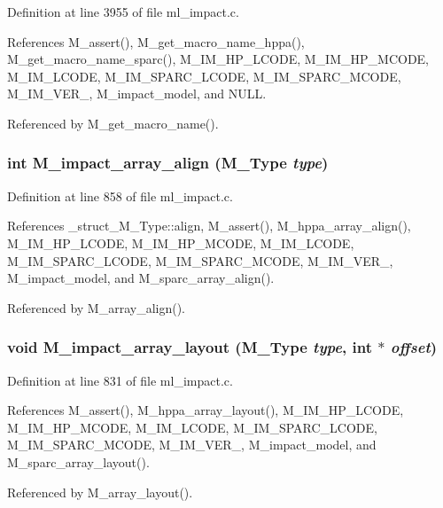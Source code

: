 Definition at line 3955 of file ml\_\-impact.c.

References M\_\-assert(), M\_\-get\_\-macro\_\-name\_\-hppa(), M\_\-get\_\-macro\_\-name\_\-sparc(), M\_\-IM\_\-HP\_\-LCODE, M\_\-IM\_\-HP\_\-MCODE, M\_\-IM\_\-LCODE, M\_\-IM\_\-SPARC\_\-LCODE, M\_\-IM\_\-SPARC\_\-MCODE, M\_\-IM\_\-VER\_, M\_\-impact\_\-model, and NULL.

Referenced by M\_\-get\_\-macro\_\-name().
\subsubsection{\setlength{\rightskip}{0pt plus 5cm}int M\_\-impact\_\-array\_\-align (\bf{M\_\-Type} {\em type})}\label{m__impact_8h_92393a8481f5f66d461a68d6daaec28f}




Definition at line 858 of file ml\_\-impact.c.

References \_\-struct\_\-M\_\-Type::align, M\_\-assert(), M\_\-hppa\_\-array\_\-align(), M\_\-IM\_\-HP\_\-LCODE, M\_\-IM\_\-HP\_\-MCODE, M\_\-IM\_\-LCODE, M\_\-IM\_\-SPARC\_\-LCODE, M\_\-IM\_\-SPARC\_\-MCODE, M\_\-IM\_\-VER\_, M\_\-impact\_\-model, and M\_\-sparc\_\-array\_\-align().

Referenced by M\_\-array\_\-align().
\subsubsection{\setlength{\rightskip}{0pt plus 5cm}void M\_\-impact\_\-array\_\-layout (\bf{M\_\-Type} {\em type}, int $\ast$ {\em offset})}\label{m__impact_8h_cb0a343bbcbffa45ccf991b9591ac643}




Definition at line 831 of file ml\_\-impact.c.

References M\_\-assert(), M\_\-hppa\_\-array\_\-layout(), M\_\-IM\_\-HP\_\-LCODE, M\_\-IM\_\-HP\_\-MCODE, M\_\-IM\_\-LCODE, M\_\-IM\_\-SPARC\_\-LCODE, M\_\-IM\_\-SPARC\_\-MCODE, M\_\-IM\_\-VER\_, M\_\-impact\_\-model, and M\_\-sparc\_\-array\_\-layout().

Referenced by M\_\-array\_\-layout().
